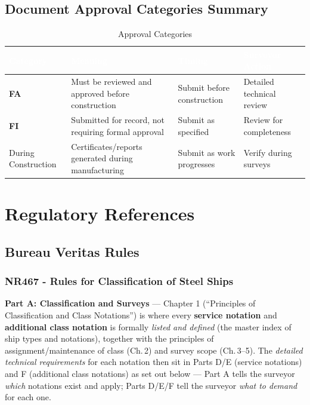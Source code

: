 \documentclass[11pt,a4paper]{report}
\newcommand{\fa}{\textbf{\textcolor{warningred}{FA}}}
\newcommand{\fic}{\textbf{\textcolor{bvgray}{FI}}}
\begin{document}
\section{Document Approval Categories Summary}

\begin{table}[H]
\centering
\caption{Approval Categories}
\begin{tabular}{|l|p{4cm}|p{3cm}|p{4cm}|}
\hline
\rowcolor{bvblue}
\textcolor{white}{\textbf{Category}} & \textcolor{white}{\textbf{Meaning}} & \textcolor{white}{\textbf{Timing}} & \textcolor{white}{\textbf{Surveyor Action}} \\
\hline
\fa{} & Must be reviewed and approved before construction & Submit before construction & Detailed technical review \\
\hline
\fic{} & Submitted for record, not requiring formal approval & Submit as specified & Review for completeness \\
\hline
During Construction & Certificates/reports generated during manufacturing & Submit as work progresses & Verify during surveys \\
\hline
\end{tabular}
\end{table}

\newpage

\chapter{Regulatory References}
\label{ch:regulations}

\section{Bureau Veritas Rules}

\subsection{NR467 - Rules for Classification of Steel Ships}

\textbf{Part A: Classification and Surveys} --- Chapter 1 (``Principles of
Classification and Class Notations'') is where every \textbf{service notation}
and \textbf{additional class notation} is formally \emph{listed and defined}
(the master index of ship types and notations), together with the principles
of assignment/maintenance of class (Ch.\,2) and survey scope (Ch.\,3--5). The
\emph{detailed technical requirements} for each notation then sit in Parts
D/E (service notations) and F (additional class notations) as set out below
--- Part A tells the surveyor \emph{which} notations exist and apply; Parts
D/E/F tell the surveyor \emph{what to demand} for each one.
\end{document}

